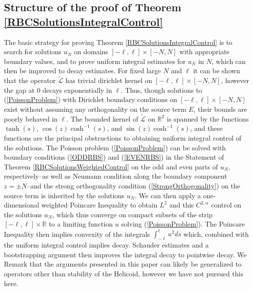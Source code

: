 \documentclass{amsart}
\newcommand{\mb}{\mathbb}
\newcommand{\mc}{\mathcal}
\newcommand{\wt}{\widetilde}
\begin{document}
\subsection{Structure of the proof of Theorem \ref{RBCSolutionsIntegralControl}}
The basic strategy for proving Theorem \ref{RBCSolutionsIntegralControl} is to search for solutions $u_N$ on domains $[-\ell, \ell] \times [-N, N]$ with appropriate boundary values, and to prove uniform integral  estimates for $u_N$ in $N$,  which can then be improved to decay estimates. For fixed large $N$ and $\ell$ it can be shown that the operator $\wt{\mc{L}}$ has trivial dirichlet kernel on  $[-\ell, \ell] \times [-N, N]$, however the gap at $0$ decays exponentially in $\ell$. Thus, though solutions to (\ref{PoissonProblem}) with Dirichlet boundary conditions on $[-\ell, \ell] \times [-N, N]$ exist without assuming any orthogonality on the source term $E$, their bounds are poorly behaved in $\ell$. The bounded kernel of $\wt{\mc{L}}$ on $\mb{R}^2$ is spanned by the functions $\tanh(s)$, $\cos(z) \cosh^{-1}(s)$, and $\sin(z) \cosh^{-1}(s)$, and these functions are the principal obstructions to obtaining uniform integral control of the solutions.  The Poisson problem  (\ref{PoissonProblem}) can be solved  with boundary conditions (\ref{ODDRBS}) and (\ref{EVENRBS}) in the Statement of Theorem \ref{RBCSolutionsWeightedControl} on the odd and even parts of $u_{N}$, respectively--as well as Neumann condition along the boundary component $z = \pm N$--and the strong orthogonality condition (\ref{StrongOrthogonality}) on  the source term is  inherited by the solutions $u_N$. We can then apply a one-dimensional weighted  Poincare Inequality to obtain $L^2$  and this $C^{2, \alpha}$ control on the solutions $u_N$, which thus converge on compact subsets of the strip $[-\ell, \ell] \times \mb{R}$ to a limiting function $u$ solving (\ref{PoissonProblem}). The Poincare Inequality then implies convexity of the integrals $\int_{-\ell}^\ell u^2 ds$ which, combined with the uniform integral control implies decay. Schauder estimates and a bootstrapping argument then improves the integral decay to pointwise decay. We Remark that the arguments presented in this paper can likely be generalized to operators other than stability of the Helicoid,  however we have not pursued this here. 
\end{document}
